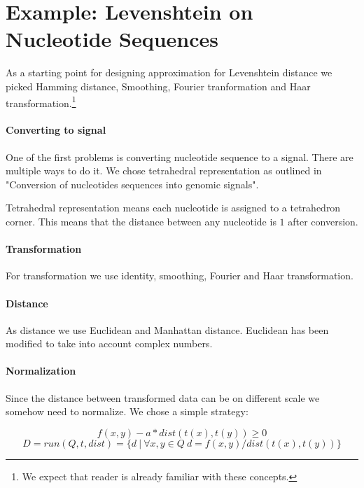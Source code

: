 \documentclass [12pt, a4]{article} %
\begin{document}
\section{Example: Levenshtein on Nucleotide Sequences}

As a starting point for designing approximation for Levenshtein distance
we picked Hamming distance\cite{wiki:Hamming}, Smoothing\cite{wiki:Smoothing}, Fourier tranformation\cite{wiki:Fourier} and Haar transformation\cite{wiki:Haar}.\footnote{We expect that reader is already familiar with these concepts.}

\paragraph{Converting to signal}

One of the first problems is converting nucleotide sequence to a signal. There are multiple ways to do it. We chose tetrahedral representation as outlined in "Conversion of nucleotides sequences into genomic signals". \cite{cristea2002conversion}

Tetrahedral representation means each nucleotide is assigned to a tetrahedron corner. This means that the distance between any nucleotide is $1$ after conversion.

\paragraph{Transformation}

For transformation we use identity, smoothing, Fourier and Haar transformation.

\paragraph{Distance}

As distance we use Euclidean and Manhattan distance. Euclidean has been modified to take into account complex numbers.

\paragraph{Normalization}

Since the distance between transformed data can be on different scale we somehow need to normalize. We chose a simple strategy:

$$f(x,y) - a*dist(t(x),t(y)) \geq 0$$
$$D = run(Q, t, dist) = \{ d ~ | ~ \forall x,y \in Q ~ d = f(x,y) / dist(t(x),t(y)) \}$$
\end{document}

